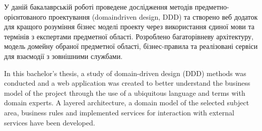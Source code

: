 
У даній бакалаврській роботі проведене дослідження методів
предметно-орієнтованого проектування (domaindriven design, DDD)
та створено веб додаток для кращого розуміння бізнес моделі
проекту через використання єдиної мови та термінів з
експертами предметної області. Розроблено багаторівневу
архітектуру, модель домейну обраної предметної області,
бізнес-правила та реалізовані сервіси для взаємодії з зовнішними службами.

\vspace*{\baselineskip}

In this bachelor's thesis, a study of domain-driven
design (DDD) methods was conducted and a web application
was created to better understand the business model
of the project through the use of a ubiquitous language
and terms with domain experts. A layered
architecture, a domain model of the selected subject area,
business rules and implemented services for interaction
with external services have been developed.

\clearpage
